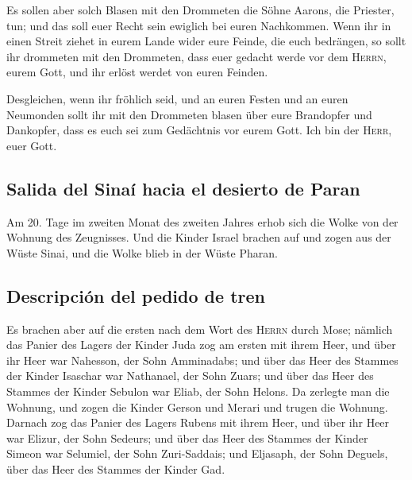  Es sollen aber solch Blasen mit den Drommeten die Söhne
Aarons, die Priester, tun; und das soll euer Recht sein ewiglich bei
euren Nachkommen.  Wenn ihr in einen Streit ziehet in
eurem Lande wider eure Feinde, die euch bedrängen, so sollt ihr
drommeten mit den Drommeten, dass euer gedacht werde vor dem
\textsc{Herrn}, eurem Gott, und ihr erlöst werdet von euren Feinden.

 Desgleichen, wenn ihr fröhlich seid, und an euren Festen
und an euren Neumonden sollt ihr mit den Drommeten blasen über eure
Brandopfer und Dankopfer, dass es euch sei zum Gedächtnis vor eurem
Gott. Ich bin der \textsc{Herr}, euer Gott.

\hypertarget{salida-del-sinauxed-hacia-el-desierto-de-paran}{%
\subsection{Salida del Sinaí hacia el desierto de
Paran}\label{salida-del-sinauxed-hacia-el-desierto-de-paran}}

 Am 20. Tage im zweiten Monat des zweiten Jahres erhob
sich die Wolke von der Wohnung des Zeugnisses.  Und die
Kinder Israel brachen auf und zogen aus der Wüste Sinai, und die Wolke
blieb in der Wüste Pharan.

\hypertarget{descripciuxf3n-del-pedido-de-tren}{%
\subsection{Descripción del pedido de
tren}\label{descripciuxf3n-del-pedido-de-tren}}

 Es brachen aber auf die ersten nach dem Wort des
\textsc{Herrn} durch Mose;  nämlich das Panier des Lagers
der Kinder Juda zog am ersten mit ihrem Heer, und über ihr Heer war
Nahesson, der Sohn Amminadabs;  und über das Heer des
Stammes der Kinder Isaschar war Nathanael, der Sohn Zuars;
 und über das Heer des Stammes der Kinder Sebulon war
Eliab, der Sohn Helons.  Da zerlegte man die Wohnung, und
zogen die Kinder Gerson und Merari und trugen die Wohnung.
 Darnach zog das Panier des Lagers Rubens mit ihrem Heer,
und über ihr Heer war Elizur, der Sohn Sedeurs;  und über
das Heer des Stammes der Kinder Simeon war Selumiel, der Sohn
Zuri-Saddais;  und Eljasaph, der Sohn Deguels, über das
Heer des Stammes der Kinder Gad.

